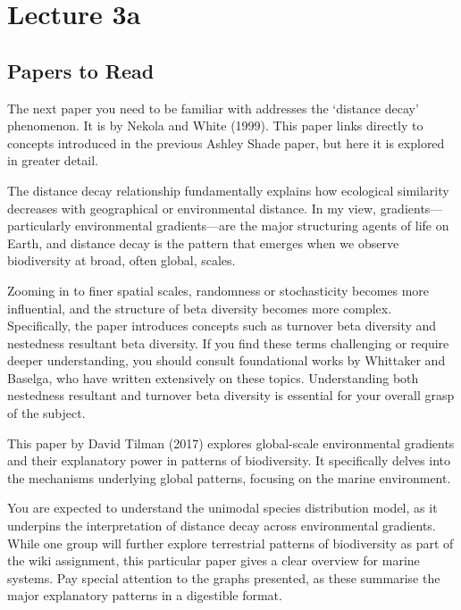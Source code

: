 \documentclass[
  10pt,
]{book}
\begin{document}
\chapter*{Lecture 3a}\label{lecture-3a}

\section{Papers to Read}\label{papers-to-read-1}

The next paper you need to be familiar with addresses the `distance
decay' phenomenon. It is by Nekola and White (1999). This paper links
directly to concepts introduced in the previous Ashley Shade paper, but
here it is explored in greater detail.

The distance decay relationship fundamentally explains how ecological
similarity decreases with geographical or environmental distance. In my
view, gradients---particularly environmental gradients---are the major
structuring agents of life on Earth, and distance decay is the pattern
that emerges when we observe biodiversity at broad, often global,
scales.

Zooming in to finer spatial scales, randomness or stochasticity becomes
more influential, and the structure of beta diversity becomes more
complex. Specifically, the paper introduces concepts such as turnover
beta diversity and nestedness resultant beta diversity. If you find
these terms challenging or require deeper understanding, you should
consult foundational works by Whittaker and Baselga, who have written
extensively on these topics. Understanding both nestedness resultant and
turnover beta diversity is essential for your overall grasp of the
subject.

This paper by David Tilman (2017) explores global-scale environmental
gradients and their explanatory power in patterns of biodiversity. It
specifically delves into the mechanisms underlying global patterns,
focusing on the marine environment.

You are expected to understand the unimodal species distribution model,
as it underpins the interpretation of distance decay across
environmental gradients. While one group will further explore
terrestrial patterns of biodiversity as part of the wiki assignment,
this particular paper gives a clear overview for marine systems. Pay
special attention to the graphs presented, as these summarise the major
explanatory patterns in a digestible format.
\end{document}
